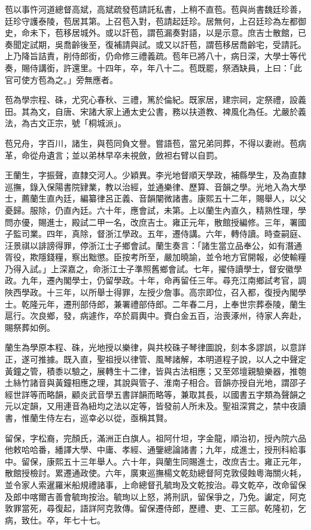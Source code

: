 \begin{pinyinscope}
苞以事忤河道總督高斌，高斌疏發苞請託私書，上稍不直苞。苞與尚書魏廷珍善，廷珍守護泰陵，苞居其第。上召苞入對，苞請起廷珍。居無何，上召廷珍為左都御史，命未下，苞移居城外。或以訐苞，謂苞漏奏對語，以是示意。庶吉士散館，已奏聞定試期，吳喬齡後至，復補請與試。或又以訐苞，謂苞移居喬齡宅，受請託。上乃降旨詰責，削侍郎銜，仍命修三禮義疏。苞年已將八十，病日深，大學士等代奏，賜侍講銜，許還里。十四年，卒，年八十二。苞既罷，祭酒缺員，上曰：「此官可使方苞為之。」旁無應者。

苞為學宗程、硃，尤究心春秋、三禮，篤於倫紀。既家居，建宗祠，定祭禮，設義田。其為文，自唐、宋諸大家上通太史公書，務以扶道教、裨風化為任。尤嚴於義法，為古文正宗，號「桐城派」。

苞兄舟，字百川，諸生，與苞同負文譽。嘗語苞，當兄弟同葬，不得以妻祔。苞病革，命從舟遺言；並以弟林早卒未視斂，斂袒右臂以自罰。

王蘭生，字振聲，直隸交河人。少穎異。李光地督順天學政，補縣學生，及為直隸巡撫，錄入保陽書院肄業，教以治經，並通樂律、歷算、音韻之學。光地入為大學士，薦蘭生直內廷，編纂律呂正義、音韻闡微諸書。康熙五十二年，賜舉人，以父憂歸。服除，仍直內廷。六十年，應會試，未第。上以蘭生內直久，精熟性理，學問亦優，賜進士，殿試二甲一名，改庶吉士。雍正元年，散館授編修。三年，署國子監司業。四年，真除，督浙江學政。五年，遷侍講。六年，轉侍讀。時查嗣庭、汪景祺以誹謗得罪，停浙江士子鄉會試。蘭生奏言：「諸生當立品奉公，如有潛通胥役，欺隱錢糧，察出黜懲。臣按考所至，嚴加曉諭，並令地方官開報，必使輸糧乃得入試。」上深嘉之，命浙江士子準照舊鄉會試。七年，擢侍讀學士，督安徽學政。九年，遷內閣學士，仍留學政。十年，命再留任三年。尋充江南鄉試考官，調陜西學政。十三年，以所舉士得罪，左授少詹事。高宗即位，召入都，復授內閣學士。乾隆元年，遷刑部侍郎，兼署禮部侍郎。二年春二月，上奉世宗葬泰陵，蘭生扈行。次良鄉，發，病遽作，卒於肩輿中。賚白金五百，治喪涿州，待家人奔赴，賜祭葬如例。

蘭生為學原本程、硃，光地授以樂律，與共校硃子琴律圖說，刻本多謬誤，以意詳正，遂可推據。既入直，聖祖授以律管、風琴諸解，本明道程子說，以人之中聲定黃鐘之管，積黍以驗之，展轉生十二律，皆與古法相應；又至郊壇親驗樂器，推匏土絲竹諸音與黃鐘相應之理，其說與管子、淮南子相合。音韻亦授自光地，謂邵子經世詳等而略韻，顧炎武音學五書詳韻而略等，兼取其長，以國書五字類為聲韻之元以定韻，又用連音為紐均之法以定等，皆發前人所未及。聖祖深賞之，禁中夜讀書，惟蘭生侍左右，巡幸必以從，亟稱其賢。

留保，字松裔，完顏氏，滿洲正白旗人。祖阿什坦，字金龍，順治初，授內院六品他敕哈哈番，繙譯大學、中庸、孝經、通鑒總論諸書；九年，成進士，授刑科給事中。留保，康熙五十三年舉人。六十年，與蘭生同賜進士，改庶吉士。雍正元年，散館授檢討。累遷通政使。六年，廣東巡撫楊文乾劾總督阿克敦侵蝕粵海關火耗，並令家人索暹羅米船規禮諸事，上命總督孔毓珣及文乾按治。尋文乾卒，改命留保及郎中喀爾吉善會毓珣按治。毓珣以上怒，將刑訊，留保爭之，乃免。讞定，阿克敦罪當死，尋復起，語詳阿克敦傳。留保遷侍郎，歷禮、吏、工三部。乾隆初，乞病，致仕。卒，年七十七。


\end{pinyinscope}
